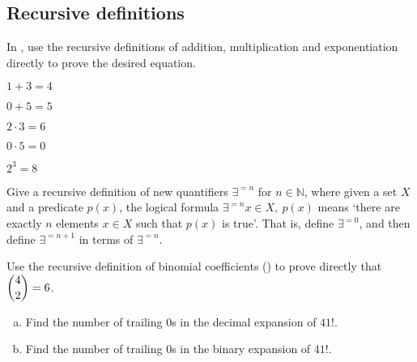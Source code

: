 \subsection*{Recursive definitions}

In , use the recursive definitions of addition, multiplication and exponentiation directly to prove the desired equation.

\begin{chapex}
\label{cqRecursiveDefinitionsOfArithmeticOperationsBegin}
$1+3=4$
\end{chapex}

\begin{chapex}
$0+5=5$
\end{chapex}

\begin{chapex}
$2 \cdot 3 = 6$
\end{chapex}

\begin{chapex}
$0 \cdot 5 = 0$
\end{chapex}

\begin{chapex}
\label{cqRecursiveDefinitionsOfArithmeticOperationsEnd}
$2^3=8$
\end{chapex}

\begin{chapex}
Give a recursive definition of new quantifiers $\exists^{=n}$ for $n \in \mathbb{N}$, where given a set $X$ and a predicate $p(x)$, the logical formula $\exists^{=n} x \in X,~ p(x)$ means `there are exactly $n$ elements $x \in X$ such that $p(x)$ is true'. That is, define $\exists^{=0}$, and then define $\exists^{=n+1}$ in terms of $\exists^{=n}$.
\end{chapex}

\begin{chapex}
Use the recursive definition of binomial coefficients () to prove directly that $\dbinom{4}{2} = 6$.
\end{chapex}

\begin{chapex}
\begin{enumerate}[(a)]
\item Find the number of trailing $0$s in the decimal expansion of $41!$.
\item Find the number of trailing $0$s in the binary expansion of $41!$.
\end{enumerate}
\end{chapex}


